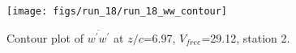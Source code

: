 \begin{figure}[H]
\centering
\texttt{[image: figs/run\_18/run\_18\_ww\_contour]}
\caption{Contour plot of $\overline{w^\prime w^\prime}$ at $z/c$=6.97, $V_{free}$=29.12, station 2.}
\label{fig:run_18_ww_contour}
\end{figure}


